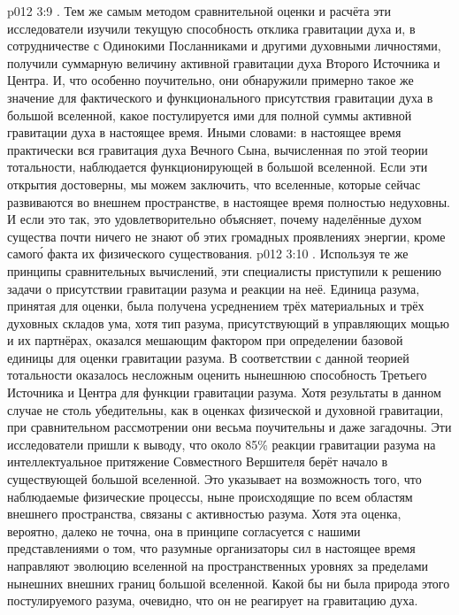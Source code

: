 \vs p012 3:9 . Тем же самым методом сравнительной оценки и расчёта эти исследователи изучили текущую способность отклика гравитации духа и, в сотрудничестве с Одинокими Посланниками и другими духовными личностями, получили суммарную величину активной гравитации духа Второго Источника и Центра. И, что особенно поучительно, они обнаружили примерно такое же значение для фактического и функционального присутствия гравитации духа в большой вселенной, какое постулируется ими для полной суммы активной гравитации духа в настоящее время. Иными словами: в настоящее время практически вся гравитация духа Вечного Сына, вычисленная по этой теории тотальности, наблюдается функционирующей в большой вселенной. Если эти открытия достоверны, мы можем заключить, что вселенные, которые сейчас развиваются во внешнем пространстве, в настоящее время полностью недуховны. И если это так, это удовлетворительно объясняет, почему наделённые духом существа почти ничего не знают об этих громадных проявлениях энергии, кроме самог\'о факта их физического существования.
\vs p012 3:10 . Используя те же принципы сравнительных вычислений, эти специалисты приступили к решению задачи о присутствии гравитации разума и реакции на неё. Единица разума, принятая для оценки, была получена усреднением трёх материальных и трёх духовных складов ума, хотя тип разума, присутствующий в управляющих мощью и их партнёрах, оказался мешающим фактором при определении базовой единицы для оценки гравитации разума. В соответствии с данной теорией тотальности оказалось несложным оценить нынешнюю способность Третьего Источника и Центра для функции гравитации разума. Хотя результаты в данном случае не столь убедительны, как в оценках физической и духовной гравитации, при сравнительном рассмотрении они весьма поучительны и даже загадочны. Эти исследователи пришли к выводу, что около 85\% реакции гравитации разума на интеллектуальное притяжение Совместного Вершителя берёт начало в существующей большой вселенной. Это указывает на возможность того, что наблюдаемые физические процессы, ныне происходящие по всем областям внешнего пространства, связаны с активностью разума. Хотя эта оценка, вероятно, далеко не точна, она в принципе согласуется с нашими представлениями о том, что разумные организаторы сил в настоящее время направляют эволюцию вселенной на пространственных уровнях за пределами нынешних внешних границ большой вселенной. Какой бы ни была природа этого постулируемого разума, очевидно, что он не реагирует на гравитацию духа.
